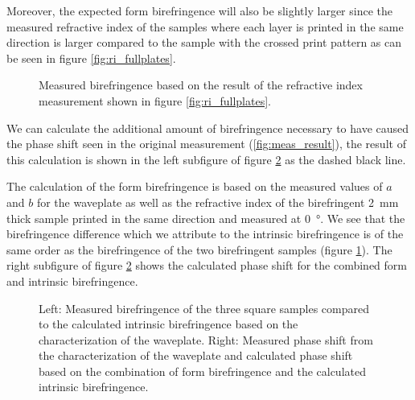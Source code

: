 Moreover, the expected form birefringence will also be slightly larger since the measured refractive index of the samples where each layer is printed in the same direction is larger compared to the sample with the crossed print pattern as can be seen in figure \ref{fig:ri_fullplates}. 

\begin{figure}[H]
    \centering
    
    \caption{Measured birefringence based on the result of the refractive index measurement shown in figure \ref{fig:ri_fullplates}.}
    \label{fig:FullPlates_bf}
\end{figure}

We can calculate the additional amount of birefringence necessary to have caused the phase shift seen in the original measurement (\ref{fig:meas_result}), the result of this calculation is shown in the left subfigure of figure \ref{fig:FullPlatesWcalc} as the dashed black line. 

The calculation of the form birefringence is based on the measured values of $a$ and $b$ for the waveplate as well as the refractive index of the birefringent \SI{2}{\milli \meter} thick sample printed in the same direction and measured at \SI{0}{\degree}. We see that the birefringence difference which we attribute to the intrinsic birefringence is of the same order as the birefringence of the two birefringent samples (figure \ref{fig:FullPlates_bf}). The right subfigure of figure \ref{fig:FullPlatesWcalc} shows the calculated phase shift for the combined form and intrinsic birefringence.

\begin{figure}[H]
    \centering
    
    \caption{Left: Measured birefringence of the three square samples compared to the calculated intrinsic birefringence based on the characterization of the waveplate. Right: Measured phase shift from the characterization of the waveplate and calculated phase shift based on the combination of form birefringence and the calculated intrinsic birefringence.}
    \label{fig:FullPlatesWcalc}
\end{figure}

